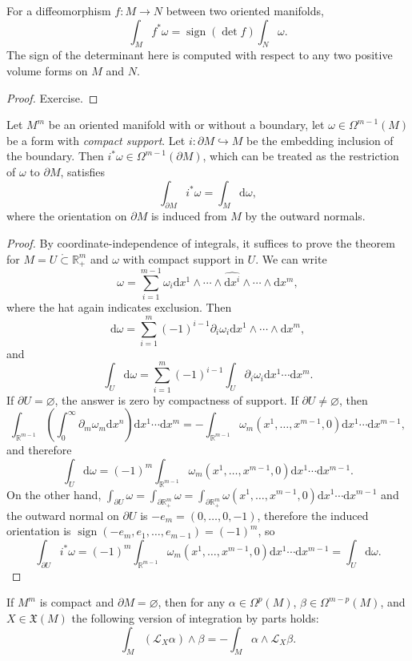 \documentclass[english,letterpaper]{article}%
\numberwithin{equation}{section}
\numberwithin{figure}{section}
\numberwithin{table}{section}
\theoremstyle{definition}
\theoremstyle{definition}
\theoremstyle{definition}
\theoremstyle{plain}
\theoremstyle{plain}
\theoremstyle{plain}
\theoremstyle{plain}
\theoremstyle{remark}
\theoremstyle{remark}
\newcommand{\dd}{{\mathrm{d}}}
\DeclareMathOperator{\sign}{sign}
\newcommand{\Lie}{\mathcal{L}}
\newcommand{\fX}{\mathfrak{X}}
\begin{document}
\begin{prop}
For a diffeomorphism $f:M\to N$ between two oriented manifolds,
\[\int_M f^\ast \omega=\sign(\det f) \int_N \omega.\]
The sign of the determinant here is computed with respect to any two positive volume forms on $M$ and $N$.
\end{prop}
\begin{proof}
Exercise.
\end{proof}


\begin{thm}[Stokes]
Let $M^m$ be an oriented manifold with or without a boundary, let $\omega\in \Omega^{m-1}(M)$ be a form with \emph{compact support}. Let $i:\partial M\hookrightarrow M$ be the embedding inclusion of the boundary. Then $i^\ast\omega\in\Omega^{m-1}(\partial M)$, which can be treated as the restriction of $\omega$  to $\partial M$, satisfies
\[\int_{\partial M}i^\ast \omega=\int_M \dd \omega,\]
where the orientation on $\partial M$ is induced from $M$ by the outward normals.
\end{thm}
\begin{proof}
By coordinate-independence of integrals, it suffices to prove the theorem for $M=U\mathring\subset \mathbb{R}^m_+$ and $\omega$ with compact support in $U$. We can write
\[\omega=\sum_{i=1}^{m-1}\omega_i \dd x^1\wedge\cdots \wedge \widehat{\dd x^i}\wedge \cdots\wedge \dd x^m,\]
where the hat again indicates exclusion. Then
\[\dd \omega=\sum_{i=1}^m (-1)^{i-1}\partial_i\omega_i \dd x^1\wedge\cdots\wedge\dd x^m,\]
and 
\[\int_U \dd\omega=\sum_{i=1}^m(-1)^{i-1}\int_U \partial_i\omega_i\dd x^1\cdots\dd x^m.\]
If $\partial U=\varnothing$, the answer is zero by compactness of support. If $\partial U\neq\varnothing$, then
\[\int_{\mathbb{R}^{m-1}}\left(\int_0^\infty \partial_m\omega_m\dd x^n\right)\dd x^1\cdots\dd x^m=-\int_{\mathbb{R}^{m-1}}\omega_m(x^1,\ldots,x^{m-1},0)\dd x^1\cdots\dd x^{m-1},\]
and therefore 
\[\int_U \dd\omega=(-1)^m\int_{\mathbb{R}^{m-1}}\omega_m(x^1,\ldots,x^{m-1},0)\dd x^1\cdots\dd x^{m-1}.\]
On the other hand, $\int_{\partial U}\omega=\int_{\partial \mathbb{R}^m_+}\omega=\int_{\partial \mathbb{R}^m_+}\omega(x^1,\ldots,x^{m-1},0)\dd x^1\cdots \dd x^{m-1}$ and the outward normal on $\partial U$ is $-e_m=(0,\ldots,0,-1)$, therefore the induced orientation is $\sign(-e_m,e_1,\ldots,e_{m-1})=(-1)^m$, so
\[\int_{\partial U}i^\ast\omega=(-1)^{m}\int_{\mathbb{R}^{m-1}}\omega_m(x^1,\ldots,x^{m-1},0)\dd x^1\cdots\dd x^{m-1}=\int_U \dd\omega.\]
\end{proof}
\begin{cor}
If $M^m$ is compact and $\partial M=\varnothing$, then for any $\alpha\in\Omega^p(M)$, $\beta\in\Omega^{m-p}(M)$, and $X\in\fX(M)$ the following version of integration by parts holds:
\[\int_M (\Lie_X \alpha)\wedge\beta=-\int_M \alpha\wedge\Lie_X\beta.\]
\end{cor}
\end{document}
